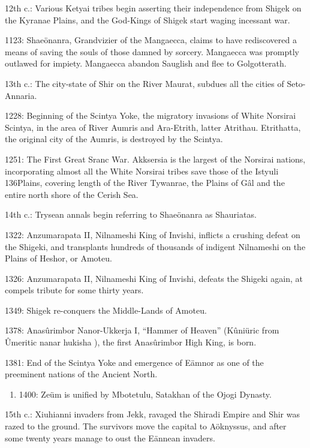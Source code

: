 \documentclass[]{book}
\providecommand{\tightlist}{%
  \setlength{\itemsep}{0pt}\setlength{\parskip}{0pt}}
\begin{document}
12th c.: Various Ketyai tribes begin asserting their independence from Shigek on the
Kyranae Plains, and the God-Kings of Shigek start waging incessant war.

1123: Shaeönanra, Grandvizier of the Mangaecca, claims to have rediscovered a
means of saving the souls of those damned by sorcery. Mangaecca was promptly
outlawed for impiety. Mangaecca abandon Sauglish and flee to Golgotterath.

13th c.: The city-state of Shir on the River Maurat, subdues all the cities of Seto-
Annaria.

1228: Beginning of the Scintya Yoke, the migratory invasions of White Norsirai
Scintya, in the area of River Aumris and Ara-Etrith, latter Atrithau. Etrithatta,
the original city of the Aumris, is destroyed by the Scintya.

1251: The First Great Sranc War. Akksersia is the largest of the Norsirai nations,
incorporating almost all the White Norsirai tribes save those of the Istyuli
136Plains, covering length of the River Tywanrae, the Plains of Gâl and the entire
north shore of the Cerish Sea.

14th c.: Trysean annals begin referring to Shaeönanra as Shauriatas.

1322: Anzumarapata II, Nilnameshi King of Invishi, inflicts a crushing defeat on the
Shigeki, and transplants hundreds of thousands of indigent Nilnameshi on
the Plains of Heshor, or Amoteu.

1326: Anzumarapata II, Nilnameshi King of Invishi, defeats the Shigeki again, at
compels tribute for some thirty years.

1349: Shigek re-conquers the Middle-Lands of Amoteu.

1378: Anasûrimbor Nanor-Ukkerja I, ``Hammer of Heaven'' (Kûniüric from
Ûmeritic nanar hukisha ), the first Anasûrimbor High King, is born.

1381: End of the Scintya Yoke and emergence of Eämnor as one of the preeminent
nations of the Ancient North.

\begin{enumerate}
\def\labelenumi{\alph{enumi}.}
\setcounter{enumi}{2}
\tightlist
\item
  1400: Zeüm is unified by Mbotetulu, Satakhan of the Ojogi Dynasty.
\end{enumerate}

15th c.: Xiuhianni invaders from Jekk, ravaged the Shiradi Empire and Shir was
razed to the ground. The survivors move the capital to Aöknyssus, and after
some twenty years manage to oust the Eännean invaders.
\end{document}
